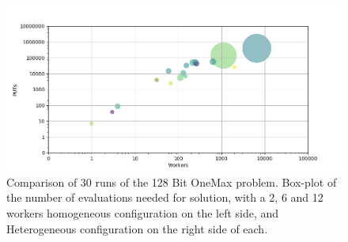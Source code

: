 \documentclass{llncs}
\begin{document}
\begin{figure}[t]
    \centering
        \includegraphics[width=5in]{img/workers_put_ip.png}
    \caption{Comparison of 30 runs of the 128 Bit OneMax problem. 
    Box-plot of the number of evaluations needed for solution, with a 2, 6 and 12 workers
    homogeneous configuration on the left side, and Heterogeneous configuration on the
    right side of each.
    }
    \label{fig:comp-onemax}
\end{figure}



\end{document}
